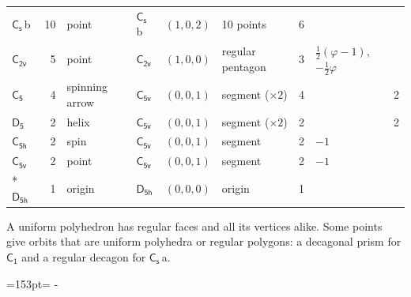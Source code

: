\documentclass[10pt,a4paper]{article}
\newcommand{\needspace}[1]{\par\penalty-100\begingroup\dimen0=#1\relax\dimen2=\pagegoal
  \advance\dimen2-\pagetotal\ifdim\dimen0>\dimen2\relax\ifdim\dimen2>0pt\vfil\break\fi\fi
  \endgroup}
\numberwithin{equation}{section}
\newcommand{\grp}[1]{\mathsf{#1}}
\newcommand{\clsletter}[1]{\,{\scriptsize\color{black!55}#1}}
\newcommand{\goldenratio}{\varphi}
\newlength{\fillwidth}\newlength{\cellwidth}\newlength{\colwidth}
\begin{document}
{{\begin{longtable}{@{}lrllllr>{\RaggedRight\arraybackslash}p{\fillwidth}r@{}}
\href{C1v.pdf}{$\grp{C_{s}}$}\clsletter{b} & 10 & point & \href{C1v.pdf}{$\grp{C_{s}}$}\clsletter{b} & $(1, 0, 2)$ & 10 points & 6 &  & \\
\href{C2v.pdf}{$\grp{C_{2v}}$} & 5 & point & \href{C2v.pdf}{$\grp{C_{2v}}$} & $(1, 0, 0)$ & regular pentagon & 3 & ${\tfrac{1}{2}(\goldenratio - 1)}$, ${-\tfrac{1}{2}\goldenratio{}}$ & \\
\href{C5.pdf}{$\grp{C_{5}}$} & 4 & spinning arrow & \href{C5v.pdf}{$\grp{C_{5v}}$} & $(0, 0, 1)$ & segment (${\times}2$) & 4 &  & 2\\
\href{D5.pdf}{$\grp{D_{5}}$} & 2 & helix & \href{C5v.pdf}{$\grp{C_{5v}}$} & $(0, 0, 1)$ & segment (${\times}2$) & 2 &  & 2\\
\href{C5h.pdf}{$\grp{C_{5h}}$} & 2 & spin & \href{C5v.pdf}{$\grp{C_{5v}}$} & $(0, 0, 1)$ & segment & 2 & ${-1}$ & \\
\href{C5v.pdf}{$\grp{C_{5v}}$} & 2 & point & \href{C5v.pdf}{$\grp{C_{5v}}$} & $(0, 0, 1)$ & segment & 2 & ${-1}$ & \\*
\href{D5h.pdf}{$\grp{D_{5h}}$} & 1 & origin & \href{D5h.pdf}{$\grp{D_{5h}}$} & $(0, 0, 0)$ & origin & 1 &  & \\
\bottomrule\end{longtable}}}
A uniform polyhedron has regular faces and all its vertices alike. Some points give orbits that are uniform polyhedra or regular polygons: a decagonal prism for \href{C1.pdf}{$\grp{C_{1}}$} and a regular decagon for \href{C1v.pdf}{$\grp{C_{s}}$}\clsletter{a}.
\needspace{153pt}
\end{document}
